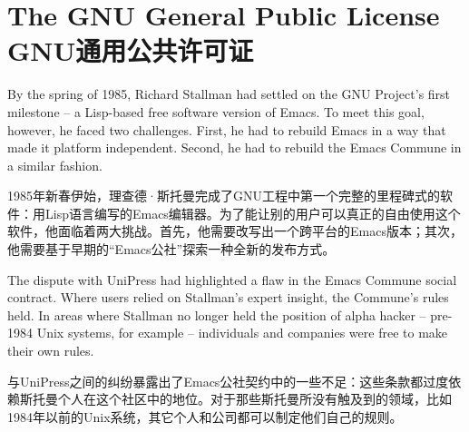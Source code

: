 

\chapter{\ifdefined\eng
The GNU General Public License
\fi
\ifdefined\chs
GNU通用公共许可证
\fi} \label{chapter:gpl}
\thispagestyle{empty}

\ifdefined\eng
By the spring of 1985, Richard Stallman had settled on the GNU Project's first milestone -- a Lisp-based free software version of Emacs. To meet this goal, however, he faced two challenges. First, he had to rebuild Emacs in a way that made it platform independent. Second, he had to rebuild the Emacs Commune in a similar fashion.
\fi

\ifdefined\chs
1985年新春伊始，理查德·斯托曼完成了GNU工程中第一个完整的里程碑式的软件：用Lisp语言编写的Emacs编辑器。为了能让别的用户可以真正的自由使用这个软件，他面临着两大挑战。首先，他需要改写出一个跨平台的Emacs版本；其次，他需要基于早期的``Emacs公社''探索一种全新的发布方式。
\fi

\ifdefined\eng
The dispute with UniPress had highlighted a flaw in the Emacs Commune social contract. Where users relied on Stallman's expert insight, the Commune's rules held. In areas where Stallman no longer held the position of alpha hacker -- pre-1984 Unix systems, for example -- individuals and companies were free to make their own rules.
\fi

\ifdefined\chs
与UniPress之间的纠纷暴露出了Emacs公社契约中的一些不足：这些条款都过度依赖斯托曼个人在这个社区中的地位。对于那些斯托曼所没有触及到的领域，比如1984年以前的Unix系统，其它个人和公司都可以制定他们自己的规则。
\fi

